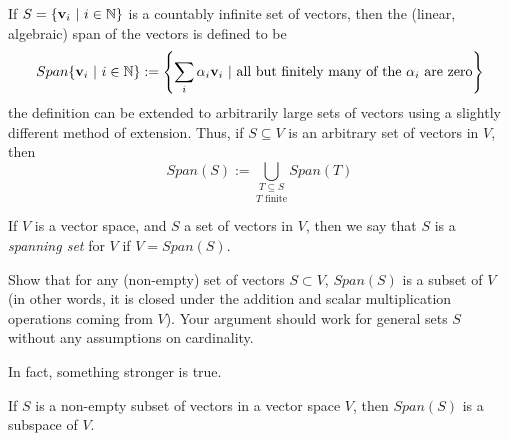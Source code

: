 \documentclass{ximera}
\begin{document}
\begin{remark} If $S = \{{\bf v}_i\ |\ i\in\mathbb N\}$ is a countably infinite set of vectors, then the (linear, algebraic) span of the vectors is defined to be
\[
Span\{{\bf v}_i\ |\ i\in\mathbb N\} := \left\{\sum_i\alpha_i{\bf v}_i\ |\ \text{all but finitely many of the }\alpha_i\text{ are zero}\right\}
\]
the definition can be extended to arbitrarily large sets of vectors using a slightly different method of extension. Thus, if $S\subseteq V$ is an arbitrary set of vectors in $V$, then
\[
Span(S) := \underset{T\text{ finite}}{\underset{T\subseteq S}{\bigcup}} Span(T)
\]
\end{remark}

\begin{definition} If $V$ is a vector space, and $S$ a set of vectors in $V$, then we say that $S$ is a {\it spanning set} for $V$ if $V = Span(S)$.
\end{definition}

\begin{exercise} Show that for any (non-empty) set of vectors $S\subset V$, $Span(S)$ is a subset of $V$ (in other words, it is closed under the addition and scalar multiplication operations coming from $V$). Your argument should work for general sets $S$ without any assumptions on cardinality.
\end{exercise}

In fact, something stronger is true.

\begin{theorem} If $S$ is a non-empty subset of vectors in a vector space $V$, then $Span(S)$ is a subspace of $V$.
\end{theorem}
\end{document}
